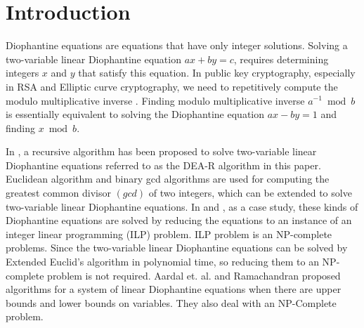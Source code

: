 \documentclass[pdflatex,sn-mathphys-num]{sn-jnl}%
\theoremstyle{thmstyleone}%
\theoremstyle{thmstyletwo}%
\theoremstyle{thmstylethree}%
\begin{document}

% 





\maketitle
\section{Introduction}
 Diophantine equations are equations that have only integer solutions. Solving a two-variable linear Diophantine equation $ax+by=c$, requires determining integers $x$ and $y$ that satisfy this equation. In public key cryptography, especially in RSA and Elliptic curve cryptography, we need to repetitively compute the modulo multiplicative inverse \cite{stallings2006cryptography}. Finding modulo multiplicative inverse $a^{-1} \bmod b$ is essentially equivalent to solving the Diophantine equation $ax-by=1$ and finding $x \bmod b$.  \par In \cite{deora2023algorithm}, a recursive algorithm has been proposed to solve two-variable linear Diophantine equations referred to as the DEA-R algorithm in this paper. Euclidean algorithm and binary gcd algorithms are used for computing the greatest common divisor $(gcd)$ of two integers, which can be extended to solve two-variable linear Diophantine equations.  
 In \cite{sumarti2023method} and \cite{kumar2022alternative}, as a case study, these kinds of Diophantine equations are solved by reducing the equations to an instance of an integer linear programming (ILP) problem. ILP problem is an NP-complete problems. Since the two-variable linear Diophantine equations can be solved by Extended Euclid's algorithm \cite{cormen2009introduction} in polynomial time, so  reducing them to an NP-complete problem is not required. Aardal et. al. \cite{aardal2000solving} and Ramachandran \cite{ramachandran2006use} proposed algorithms for a system of linear Diophantine equations when there are upper bounds and lower bounds on variables. They also deal with an NP-Complete problem. 
 
\end{document}

